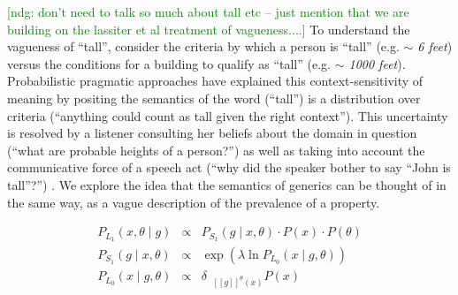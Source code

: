 \documentclass[10pt,letterpaper]{article}
\newcommand{\denote}[1]{\mbox{ $[\![ #1 ]\!]$}}
\newcommand{\ndg}[1]{\textcolor{Green}{[ndg: #1]}}
\begin{document}
\ndg{don't need to talk so much about tall etc -- just mention that we are building on the lassiter et al treatment of vagueness....}
To understand the vagueness of ``tall'', consider the criteria by which a person is ``tall'' (e.g. \emph{$\sim$ 6 feet}) versus the conditions for a building to qualify as ``tall'' (e.g. \emph{$\sim$ 1000 feet}).
Probabilistic pragmatic approaches have explained this context-sensitivity of meaning by positing the semantics of the word (``tall'') is a distribution over criteria (``anything could count as tall given the right context''). 
This uncertainty is resolved by a listener consulting her beliefs about the domain in question (``what are probable heights of a person?'') as well as taking into account the communicative force of a speech act (``why did the speaker bother to say ``John is tall''?'') \cite{Lassiter2013,Lassiter2015,Qing2014}.
We explore the idea that the semantics of generics can be thought of in the same way, as a vague description of the prevalence of a property.
%
%
%
%
%

\begin{eqnarray}
P_{L_{1}}(x , \theta \mid g) &\propto& P_{S_{1}}(g \mid x, \theta) \cdot P(x) \cdot P(\theta) \label{eq:L1}\\
P_{S_{1}}(g \mid x, \theta) &\propto& \exp(\lambda \ln {P_{L_{0}}(x \mid g, \theta)}) \label{eq:S1}\\
P_{L_{0}}(x \mid g, \theta) &\propto& {\delta_{\denote{g}^{\theta}(x)} P(x)} \label{eq:L0}
\end{eqnarray}
\end{document}
